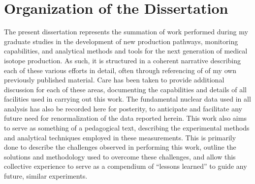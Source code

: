 






% 
% 
% 




\section{Organization of the Dissertation}

The present dissertation represents the summation of work performed during my graduate studies in the development of new production pathways, monitoring capabilities, and analytical methods and tools for the next generation of medical isotope production.
As such, it is structured in a coherent narrative describing each of these various efforts in detail, often  through referencing of  of my own previously published material.
Care has been taken to provide additional discussion for each of these areas, documenting the capabilities and details of all facilities used in carrying out this work.
The fundamental nuclear data used in all analysis has also be recorded here for posterity, to anticipate and facilitate any future need for renormalization of the data reported herein.
This work also aims to serve as something of a pedagogical text, describing the experimental methods and analytical techniques employed in these measurements.
This is primarily done to describe the challenges observed in performing this work, outline the solutions and methodology used to overcome these challenges, and allow this collective experience to serve as a compendium of \enquote{lessons learned} to guide any future, similar experiments.




